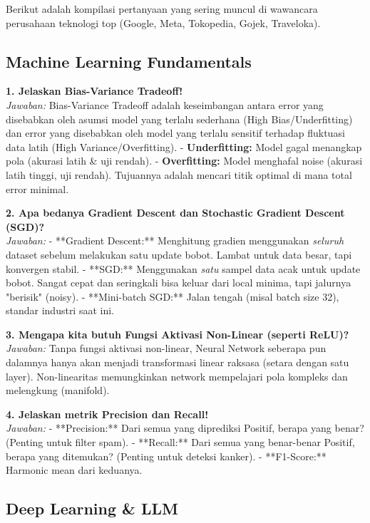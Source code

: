 Berikut adalah kompilasi pertanyaan yang sering muncul di wawancara perusahaan teknologi top (Google, Meta, Tokopedia, Gojek, Traveloka).

\subsection{Machine Learning Fundamentals}

\textbf{1. Jelaskan Bias-Variance Tradeoff!} \\
\textit{Jawaban:} Bias-Variance Tradeoff adalah keseimbangan antara error yang disebabkan oleh asumsi model yang terlalu sederhana (High Bias/Underfitting) dan error yang disebabkan oleh model yang terlalu sensitif terhadap fluktuasi data latih (High Variance/Overfitting).
- \textbf{Underfitting:} Model gagal menangkap pola (akurasi latih \& uji rendah).
- \textbf{Overfitting:} Model menghafal noise (akurasi latih tinggi, uji rendah).
Tujuannya adalah mencari titik optimal di mana total error minimal.

\textbf{2. Apa bedanya Gradient Descent dan Stochastic Gradient Descent (SGD)?} \\
\textit{Jawaban:}
- **Gradient Descent:** Menghitung gradien menggunakan \textit{seluruh} dataset sebelum melakukan satu update bobot. Lambat untuk data besar, tapi konvergen stabil.
- **SGD:** Menggunakan \textit{satu} sampel data acak untuk update bobot. Sangat cepat dan seringkali bisa keluar dari local minima, tapi jalurnya "berisik" (noisy).
- **Mini-batch SGD:** Jalan tengah (misal batch size 32), standar industri saat ini.

\textbf{3. Mengapa kita butuh Fungsi Aktivasi Non-Linear (seperti ReLU)?} \\
\textit{Jawaban:} Tanpa fungsi aktivasi non-linear, Neural Network seberapa pun dalamnya hanya akan menjadi transformasi linear raksasa (setara dengan satu layer). Non-linearitas memungkinkan network mempelajari pola kompleks dan melengkung (manifold).

\textbf{4. Jelaskan metrik Precision dan Recall!} \\
\textit{Jawaban:}
- **Precision:** Dari semua yang diprediksi Positif, berapa yang benar? (Penting untuk filter spam).
- **Recall:** Dari semua yang benar-benar Positif, berapa yang ditemukan? (Penting untuk deteksi kanker).
- **F1-Score:** Harmonic mean dari keduanya.

\subsection{Deep Learning \& LLM}

